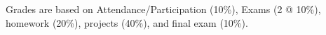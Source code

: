 
Grades are based on Attendance/Participation (10\%), Exams (2 @ 10\%), homework (20\%), projects (40\%), and final exam (10\%).   
